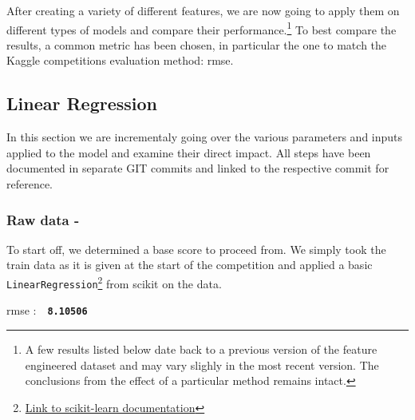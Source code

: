 \newcommand{\rmse}[1]{
	\vspace*{-2mm}
	\begin{center}
		\begin{tcolorbox}[colback=white, colframe=iwiPurple, halign=flush center, width=0.8\linewidth, boxrule=1pt, arc=4mm]
				\Acrshort{rmse} :\ \ \textbf{\texttt{#1}}
		\end{tcolorbox}
	\end{center}
}


After creating a variety of different features, we are now going to apply them on different types of models and compare their performance.\footnote{A few results listed below date back to a previous version of the feature engineered dataset and may vary slighly in the most recent version. The conclusions from the effect of a particular method remains intact.} To best compare the results, a common metric has been chosen, in particular the one to match the Kaggle competitions evaluation method: \acrfull{rmse}.

\subsection{Linear Regression}

In this section we are incrementaly going over the various parameters and inputs applied to the model and examine their direct impact. All steps have been documented in separate GIT commits and linked to the respective commit for reference.

\subsubsection{Raw data - }

To start off, we determined a base score to proceed from. We simply took the train data as it is given at the start of the competition and applied a basic \texttt{LinearRegression}\footnote{\href{https://scikit-learn.org/stable/modules/generated/sklearn.linear_model.LinearRegression.html\#sklearn.linear_model.LinearRegression}{Link to scikit-learn documentation}} from \gls{scikit} on the data.
\rmse{8.10506}


